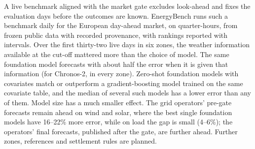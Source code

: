 \documentclass[11pt,a4paper]{article}
\begin{document}
A live benchmark aligned with the market gate excludes look-ahead and fixes the evaluation days before the outcomes
are known. EnergyBench runs such a benchmark daily for the European day-ahead market, on quarter-hours, from frozen
public data with recorded provenance, with rankings reported with intervals. Over the first thirty-two live days in six zones, the weather information available at the cut-off
mattered more than the choice of model. The same foundation model forecasts with about half the error when it is given that
information (for Chronos-2, in every zone). Zero-shot foundation models with covariates match or outperform a
gradient-boosting model trained on the same covariate table, and the median of several such models has a lower error
than any of them. Model size has a much smaller effect. The grid operators' pre-gate forecasts remain ahead on wind and solar,
where the best single foundation
models have 16--22\% more error, while on load the gap is small (4--6\%); the operators'
final forecasts, published after the gate, are further ahead. Further zones, references and settlement rules are
planned.
\end{document}
